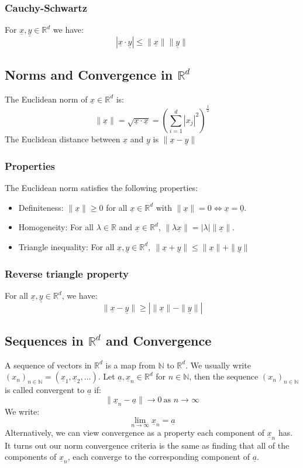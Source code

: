 \documentclass[12pt]{article}
\newcommand{\seq}[2]{(#1_#2)_{#2\in\mathbb{N}}}
\begin{document}
\subsubsection{Cauchy-Schwartz}
For \(\underline{x}, \underline{y}\in\mathbb{R}^d\) we have:
\[|\underline{x}\cdot \underline{y}|\leq \|\underline{x}\|\|\underline{y}\|\]
\subsection{Norms and Convergence in \(\mathbb{R}^d\)}
The Euclidean norm of \(\underline{x}\in\mathbb{R}^d\) is:
\[\|\underline{x}\|=\sqrt{\underline{x}\cdot\underline{x}}=\left(\sum^d_{i=1}|x_j|^2\right)^{\frac{1}{2}}\]
The Euclidean distance between \(\underline{x}\) and \(\underline{y}\) is \(\|\underline{x}-\underline{y}\|\)
\subsubsection{Properties}
The Euclidean norm satisfies the following properties:
\begin{itemize}
    \item Definiteness: \(\|\underline{x}\|\geq 0\) for all \(\underline{x}\in\mathbb{R}^d\) with \(\|\underline{x}\|=0\iff \underline{x}=\underline{0}\).
    \item Homogeneity: For all \(\lambda\in\mathbb{R}\) and \(\underline{x}\in\mathbb{R}^d\), \(\|\lambda \underline{x}\|=|\lambda|\|\underline{x}\|\).
    \item Triangle inequality: For all \(\underline{x}, \underline{y}\in\mathbb{R}^d,\ \|\underline{x}+\underline{y}\|\leq  \|\underline{x}\|+\|\underline{y}\|\)
\end{itemize}
\subsubsection{Reverse triangle property}
For all \(\underline{x},\underline{y}\in\mathbb{R}^d\), we have:
\[\|\underline{x}-\underline{y}\|\geq |\|\underline{x}\|-\|\underline{y}\||\]
\subsection{Sequences in \(\mathbb{R}^d\) and Convergence}
A sequence of vectors in \(\mathbb{R}^d\) is a map from \(\mathbb{N}\) to \(\mathbb{R}^d\). We usually write \(\seq{x}{n}=(\underline{x}_1,\underline{x}_2,\dots)\). Let \(\underline{a}, \underline{x}_n\in\mathbb{R}^d\) for \(n\in\mathbb{N}\), then the sequence \(\seq{x}{n}\) is called convergent to \(\underline{a}\) if:
\[\|\underline{x}_n-\underline{a}\|\to0\ \text{as }n\to\infty\]
We write:
\[\lim_{n\to\infty}\underline{x}_n=\underline{a}\]
Alternatively, we can view convergence as a property each component of \(\underline{x}_n\) has. It turns out our norm convergence criteria is the same as finding that all of the components of \(\underline{x}_n\), each converge to the corresponding component of \(\underline{a}\).
\end{document}
